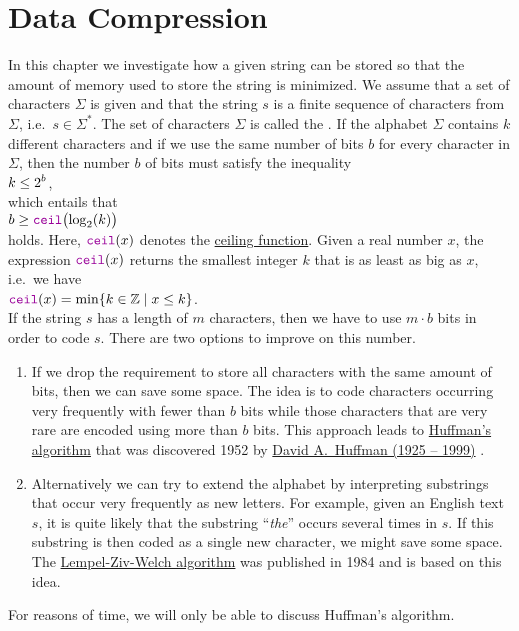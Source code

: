 \chapter{Data Compression}
In this chapter we investigate how a given string can be stored so that the amount of memory used to store the
string is minimized.   We assume that a set of characters $\Sigma$ is given and that the string $s$ is a finite
sequence of characters from $\Sigma$, i.e.~$s \in \Sigma^*$.  The set of characters $\Sigma$ is called the
.  If the alphabet $\Sigma$ contains $k$ different characters and if we use the same number of
bits $b$ for every character in $\Sigma$, then the number $b$ of bits must satisfy the inequality
\\[0.2cm]
\hspace*{1.3cm}
$\displaystyle k \leq 2^b$,
\\[0.2cm]
which entails that 
\\[0.2cm]
\hspace*{1.3cm}
$b \geq \mytt{ceil}\bigl(\log_2(k)\bigr)$
\\[0.2cm]
holds.  Here, $\mytt{ceil}(x)$ denotes the
\href{https://en.wikipedia.org/wiki/Floor_and_ceiling_functions}{ceiling function}.  Given a real number $x$,
the expression $\mytt{ceil}(x)$ returns the smallest integer $k$ that is as least as big as $x$, i.e.~we have
\\[0.2cm]
\hspace*{1.3cm}
$\mytt{ceil}(x) = \min \{ k \in \mathbb{Z} \mid x \leq k \}$. 
\\[0.2cm]
If the string $s$ has a length of $m$ characters, then we have to use $m \cdot b$ bits in order to code $s$. 
There are two options to improve on this number.
\begin{enumerate}
\item If we drop the requirement to store all characters with the same amount of bits, then we can save some space.
      The idea is to code characters occurring very frequently with fewer than $b$ bits while those characters
      that are very rare are encoded using more than $b$ bits.  This approach leads to 
      \href{https://en.wikipedia.org/wiki/Huffman_coding}{Huffman's algorithm} that was discovered 1952 by 
      \href{https://en.wikipedia.org/wiki/David_A._Huffman}{David A.~Huffman (1925 -- 1999)} \cite{huffman:52}.
\item Alternatively we can try to extend the alphabet by interpreting substrings that occur very frequently as
      new letters.  For example, given an English text $s$, it is quite likely that the substring 
      ``\emph{the}'' occurs several times in $s$.  If this substring is then coded as a single new character,
      we might save some space.  The 
      \href{https://en.wikipedia.org/wiki/Lempel-Ziv-Welch}{Lempel-Ziv-Welch algorithm} 
      \cite{ziv:77,ziv:78,welch:84} was published in 1984 and is based on this idea.

\end{enumerate}
For reasons of time, we will only be able to discuss Huffman's algorithm.

